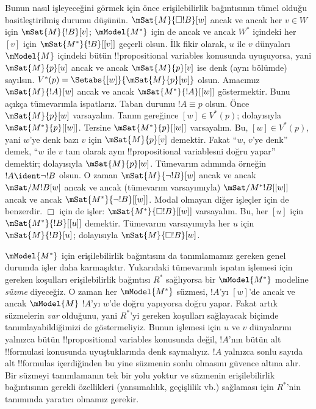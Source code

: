 \documentclass[../../../include/open-logic-section]{subfiles}
\begin{document}
  Bunun nasıl işleyeceğini görmek için önce erişilebilirlik bağıntısının
  tümel olduğu basitleştirilmiş durumu düşünün. $\mSat{M}{\Box!B}[w]$ ancak
  ve ancak her $v\in W$ için $\mSat{M}{!B}[v]$; $\mModel{M^*}$ için de ancak
  ve ancak $W^*$ içindeki her $[v]$ için $\mSat{M^*}{!B}[{[v]}]$ geçerli olsun. İlk
  fikir olarak, $u$ ile $v$ dünyaları $\mModel{M}$ içindeki
bütün !!{propositional variable}s konusunda uyuşuyorsa, yani
$\mSat{M}{p}[u]$ ancak ve ancak $\mSat{M}{p}[v]$ ise denk (aynı bölümde)
sayılsın. $V^*(p)=\Setabs{[w]}{\mSat{M}{p}[w]}$ olsun. Amacımız
$\mSat{M}{!A}[w]$ ancak ve ancak $\mSat{M^*}{!A}[{[w]}]$ göstermektir.
Bunu açıkça tümevarımla ispatlarız. Taban durumu $!A\equiv p$ olsun. Önce
  $\mSat{M}{p}[w]$ varsayalım. Tanım gereğince $[w]\in V^*(p)$; dolayısıyla
$\mSat{M^*}{p}[{[w]}]$. Tersine $\mSat{M^*}{p}[{[w]}]$ varsayalım. Bu,
$[w]\in V^*(p)$, yani $w$'ye denk bazı $v$ için $\mSat{M}{p}[v]$ demektir.
Fakat ``$w$, $v$'ye denk'' demek, ``$w$ ile $v$ tam olarak aynı
!!{propositional variable}s{}ni doğru yapar'' demektir; dolayısıyla
$\mSat{M}{p}[w]$. Tümevarım adımında örneğin $!A\ident\lnot!B$ olsun.
O zaman $\mSat{M}{\lnot!B}[w]$ ancak ve ancak $\mSat/{M}{!B}[w]$ ancak ve
ancak (tümevarım varsayımıyla) $\mSat/{M^*}{!B}[{[w]}]$ ancak ve ancak
$\mSat{M^*}{\lnot!B}[{[w]}]$. Modal olmayan diğer işleçler için de
benzerdir. $\Box$ için de işler: $\mSat{M^*}{\Box!B}[{[w]}]$ varsayalım.
Bu, her $[u]$ için $\mSat{M^*}{!B}[{[u]}]$ demektir. Tümevarım
varsayımıyla her $u$ için $\mSat{M}{!B}[u]$; dolayısıyla
$\mSat{M}{\Box!B}[w]$.

$\mModel{M^*}$ için erişilebilirlik bağıntısını da tanımlamamız gereken
genel durumda işler daha karmaşıktır. Yukarıdaki tümevarımlı ispatın
işlemesi için gereken koşulları erişilebilirlik bağıntısı $R^*$ sağlıyorsa
bir $\mModel{M^*}$ modeline \emph{süzme} diyeceğiz. O zaman her
$\mModel{M^*}$ süzmesi, $!A$'yı $[w]$'de ancak ve ancak $\mModel{M}$
$!A$'yı $w$'de doğru yapıyorsa doğru yapar. Fakat artık süzmelerin
\emph{var} olduğunu, yani $R^*$'yi gereken koşulları sağlayacak biçimde
  tanımlayabildiğimizi de göstermeliyiz. Bunun işlemesi için $u$ ve $v$ dünyalarını
yalnızca bütün !!{propositional variable}s konusunda değil, $!A$'nın bütün
alt !!{formula}s{}i konusunda uyuştuklarında denk saymalıyız. $!A$ yalnızca
sonlu sayıda alt !!{formula}s içerdiğinden bu yine süzmenin sonlu olmasını
güvence altına alır. Bir süzmeyi tanımlamanın tek bir yolu yoktur ve
süzmenin erişilebilirlik bağıntısının gerekli özellikleri (yansımalılık,
geçişlilik vb.) sağlaması için $R^*$'nin tanımında yaratıcı olmamız gerekir.
\end{document}
